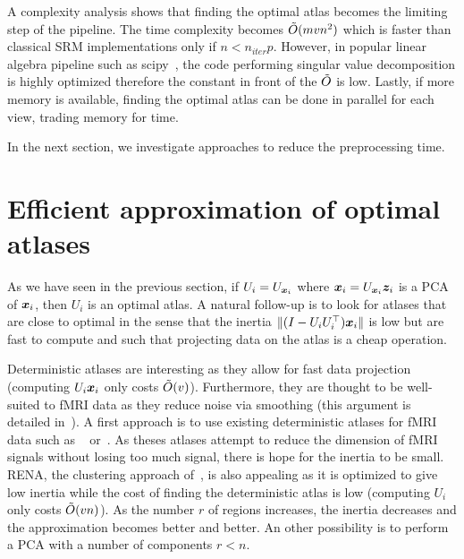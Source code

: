 A complexity analysis  shows that finding the optimal atlas becomes the limiting step of the pipeline. The time complexity becomes $\tilde{O}(mvn^2)$ which is faster than classical SRM implementations only if $n < n_{iter} p$. However, in popular
linear algebra pipeline such as scipy~\cite{2020SciPy-NMeth}, the code
performing singular value decomposition is highly optimized therefore the
constant in front of the $\tilde{O}$ is low. Lastly, if more memory is available, finding the optimal atlas can be done in parallel for each view, trading memory for time.

In the next section, we investigate approaches to reduce the preprocessing time.

\section{Efficient approximation of optimal atlases}
As we have seen in the previous section, if $U_i = U_{\boldsymbol{x}_i}$ where $\boldsymbol{x}_i =
U_{\boldsymbol{x}_i} \boldsymbol{z}_i$ is a PCA of $\boldsymbol{x}_i$, then $U_i$ is an optimal atlas.
A natural follow-up is to look for atlases that are close to optimal in the
sense that the inertia $\| (I - U_i U_i^{\top}) \boldsymbol{x}_i \|$ is low but are fast to
compute and such that projecting data on the atlas is a cheap operation.

Deterministic atlases are interesting as they allow for fast data projection
(computing $U_i \boldsymbol{x}_i$ only costs $\tilde{O}(v)$). Furthermore, they are thought to
be well-suited to fMRI data as they reduce noise via smoothing (this argument is
detailed in~\cite{hoyos2018recursive}).
%
A first approach is to use existing deterministic atlases for fMRI data such as 
~\cite{schaefer2017local} or~\cite{bellec2010multi}. As theses atlases
attempt to reduce the dimension of fMRI signals without losing too much signal,
there is hope for the inertia to be small.
RENA, the clustering approach
of~\cite{hoyos2018recursive}, is also appealing as it is optimized to give low
inertia while the cost of finding the deterministic atlas is low (computing $U_i$ only costs
$\tilde{O}(vn)$). As the number $r$ of regions increases, the inertia decreases
and the approximation becomes better and better. An other possibility is to
perform a PCA with a number of components $r < n$.

